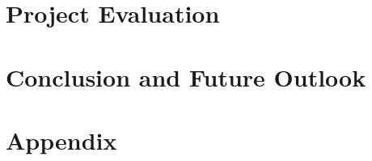 \documentclass[12pt]{report}
\numberwithin{figure}{chapter}
\begin{document}
\chapter{Project Evaluation}
                       
\chapter{Conclusion and Future Outlook}
\newpage
% 


\chapter*{Appendix}
\end{document}
